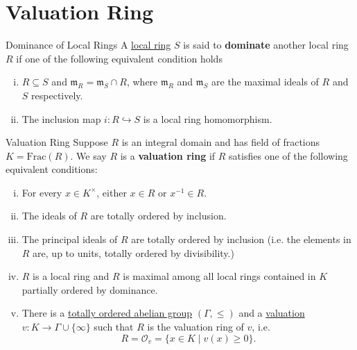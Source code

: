 \section{Valuation Ring}

\begin{definition}{Dominance of Local Rings}{}
    A \hyperref[th:local_commutative_ring]{local ring} $S$ is said to \textbf{dominate} another local ring $R$ if one of the following equivalent condition holds
    \begin{enumerate}[(i)]
        \item $R\subseteq S$ and $\mathfrak{m}_R=\mathfrak{m}_S\cap R$, where $\mathfrak{m}_R$ and $\mathfrak{m}_S$ are the maximal ideals of $R$ and $S$ respectively.
        \item The inclusion map $i:R\hookrightarrow S$ is a local ring homomorphism.
    \end{enumerate}
  
\end{definition}

\begin{definition}{Valuation Ring}{}
    Suppose $R$ is an integral domain and has field of fractions $K=\mathrm{Frac}\left(R\right)$. We say $R$ is a \textbf{valuation ring} if $R$ satisfies one of the following equivalent conditions:
    \begin{enumerate}[(i)]
        \item For every $x\in K^\times$, either $x\in R$ or $x^{-1}\in R$.
        \item The ideals of $R$ are totally ordered by inclusion.
        \item The principal ideals of $R$ are totally ordered by inclusion (i.e. the elements in $R$ are, up to units, totally ordered by divisibility.)
        \item $R$ is a local ring and $R$ is maximal among all local rings contained in $K$ partially ordered by dominance.
        \item There is a \hyperref[th:totally_ordered_abelian_group]{totally ordered abelian group} $\left(\Gamma,\le\right)$ and a \hyperref[th:valuation_of_field]{valuation} $v:K \rightarrow \Gamma \cup\{\infty\}$ such that $R$ is the valuation ring of $v$, i.e.
        \[
            R=\mathcal{O}_v=\{x \in K \mid v(x) \ge 0\}.
        \]
    \end{enumerate}
\end{definition}

